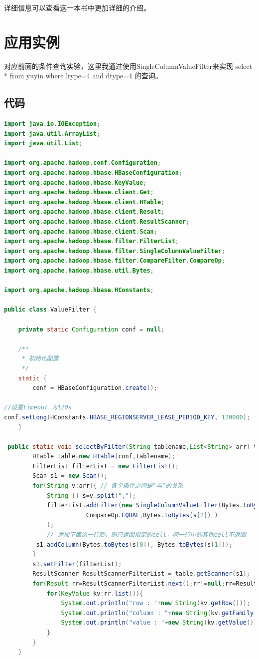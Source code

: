 详细信息可以查看\cite{HBaseGuide}这一本书中更加详细的介绍。

\section{应用实例}
对应前面的条件查询实验，这里我通过使用SingleColumnValueFilter来实现 select * from yuyin where ltype=4 and dtype=4 的查询。

\subsection{代码}

\begin{lstlisting}[language=Java]
import java.io.IOException;
import java.util.ArrayList;
import java.util.List;

import org.apache.hadoop.conf.Configuration;
import org.apache.hadoop.hbase.HBaseConfiguration;
import org.apache.hadoop.hbase.KeyValue;
import org.apache.hadoop.hbase.client.Get;
import org.apache.hadoop.hbase.client.HTable;
import org.apache.hadoop.hbase.client.Result;
import org.apache.hadoop.hbase.client.ResultScanner;
import org.apache.hadoop.hbase.client.Scan;
import org.apache.hadoop.hbase.filter.FilterList;
import org.apache.hadoop.hbase.filter.SingleColumnValueFilter;
import org.apache.hadoop.hbase.filter.CompareFilter.CompareOp;
import org.apache.hadoop.hbase.util.Bytes;

import org.apache.hadoop.hbase.HConstants;

public class ValueFilter {

    private static Configuration conf = null;

    /** 
     * 初始化配置 
     */
    static {
        conf = HBaseConfiguration.create();

//设置timeout 为120s
conf.setLong(HConstants.HBASE_REGIONSERVER_LEASE_PERIOD_KEY, 120000);
    } 
     
 public static void selectByFilter(String tablename,List<String> arr) throws IOException{   
        HTable table=new HTable(conf,tablename);   
        FilterList filterList = new FilterList();
        Scan s1 = new Scan();
        for(String v:arr){ // 各个条件之间是“与”的关系   
            String [] s=v.split(",");
            filterList.addFilter(new SingleColumnValueFilter(Bytes.toBytes(s[0]),Bytes.toBytes(s[1]),
                       CompareOp.EQUAL,Bytes.toBytes(s[2]) )
            );
            // 添加下面这一行后，则只返回指定的cell，同一行中的其他cell不返回   
         s1.addColumn(Bytes.toBytes(s[0]), Bytes.toBytes(s[1]));   
        }
        s1.setFilter(filterList);
        ResultScanner ResultScannerFilterList = table.getScanner(s1);
        for(Result rr=ResultScannerFilterList.next();rr!=null;rr=ResultScannerFilterList.next()){
            for(KeyValue kv:rr.list()){
                System.out.println("row : "+new String(kv.getRow()));
                System.out.println("column : "+new String(kv.getFamily()));
                System.out.println("value : "+new String(kv.getValue()));
            }
        }
    }


\end{lstlisting}
